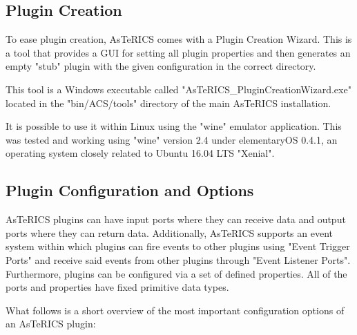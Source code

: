 \documentclass[BSA,Bachelor,english]{twbook}%
\begin{document}
\subsection{Plugin Creation}

To ease plugin creation, AsTeRICS comes with a Plugin Creation Wizard. This is a tool that provides a GUI for setting all plugin properties and then generates an empty "stub" plugin with the given configuration in the correct directory.

This tool is a Windows executable called "AsTeRICS\_PluginCreationWizard.exe" located in the "bin/ACS/tools" directory of the main AsTeRICS installation.

It is possible to use it within Linux using the "wine" emulator application. This was tested and working using "wine" version 2.4 under elementaryOS 0.4.1, an operating system closely related to Ubuntu 16.04 LTS "Xenial".
\newpage
\subsection{Plugin Configuration and Options}

AsTeRICS plugins can have input ports where they can receive data and output ports where they can return data. Additionally, AsTeRICS supports an event system within which plugins can fire events to other plugins using "Event Trigger Ports" and receive said events from other plugins through "Event Listener Ports". Furthermore, plugins can be configured via a set of defined properties. All of the ports and properties have fixed primitive data types.

What follows is a short overview of the most important configuration options of an AsTeRICS plugin:
\end{document}
